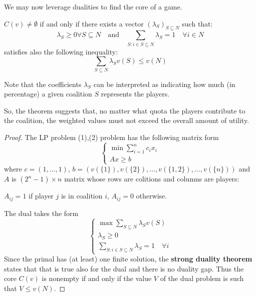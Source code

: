\documentclass[../main.tex]{subfiles}
\begin{document}
We may now leverage dualities to find the core of a game.

\begin{theorem}
    $C(v) \neq \emptyset$ if and only if there exists a vector $(\lambda_S)_{S \subseteq N}$ such that:
    \[
        \lambda_S \geq 0 \forall S \subseteq N \quad \text{and} \quad \sum_{S: i \in S \subseteq N} \lambda_S = 1 \quad \forall i \in N
    \]
    satisfies also the following inequality:
    \[
        \sum_{S \subseteq N} \lambda_S v(S) \leq v(N)
    \]
\end{theorem}
Note that the coefficients $\lambda_S$ can be interpreted as indicating how much (in percentage) a given coalition $S$ represents the players.

So, the theorem suggests that, no matter what quota the players contribute to the coalition, the weighted values must not exceed the overall amount of utility.
\begin{proof}
    The \gls{LP} problem (1),(2) problem has the following matrix form
    \[
        \begin{cases}
            \min \sum_{i=1}^n c_i x_i \\
            Ax \geq b
        \end{cases}
    \]
    where $c = (1, \ldots, 1)$, $b = (v(\{1\}), v(\{2\}), \ldots, v(\{1, 2\}), \ldots, v(\{n\}))$ and $A$ is $(2^n - 1) \times n$ matrix whose rows are colitions and columns are players:

    $A_{ij} = 1$ if player $j$ is in coalition $i$, $A_{ij} = 0$ otherwise.

    The dual takes the form
    \[
        \begin{cases}
            \max \sum_{S \subseteq N} \lambda_S v(S) \\
            \lambda_S \geq 0                         \\
            \sum_{S:i\in S \subseteq N} \lambda_S = 1 \quad \forall i
        \end{cases}
    \]
    Since the primal has (at least) one finite solution, the \textbf{strong duality theorem} states that that is true also for the dual and there is no duality gap. Thus the core $C(v)$ is nonempty if and only if the value $V$ of the dual problem is such that $V \leq v(N)$.
\end{proof}
\end{document}
